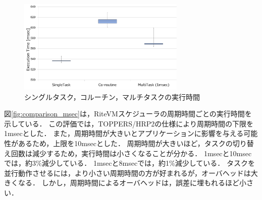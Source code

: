 \documentclass[submit,techrep]{ipsj}
\begin{document}


\begin{figure}[t]
    \centering
    \includegraphics[width=8cm,clip]{../EMSOFT2016/figure/comparison_s_c_m.pdf}
    \caption{シングルタスク，コルーチン，マルチタスクの実行時間}
\vspace{-2mm}
    \label{fig:comparison_s_c_m}
\end{figure}

図\ref{fig:comparison_msec}は，RiteVMスケジューラの周期時間ごとの実行時間を示している．
この評価では，TOPPERS/HRP2の仕様により周期時間の下限を1msecとした．
また，周期時間が大きいとアプリケーションに影響を与える可能性があるため，上限を10msecとした．
周期時間が大きいほど，タスクの切り替え回数は減少するため，実行時間は小さくなることが分かる．
1msecと10msecでは，約3\%減少している．
1msecと8msecでは，約1\%減少している．
タスクを並行動作させるには，より小さい周期時間の方が好まれるが，オーバヘッドは大きくなる．
しかし，周期時間によるオーバヘッドは，誤差に埋もれるほど小さい．
\end{document}
